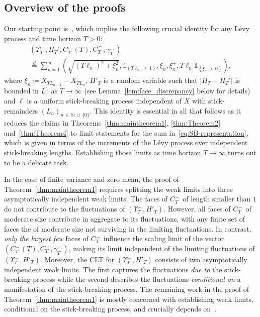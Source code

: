 \documentclass[AHL,Unicode,longabstracts,published]{cedram}
\newcommand\N{\mathbb{N}}
\newcommand\1{\mathds{1}}
\newcommand\eqd{\overset{d}{=}}
\newcommand\ov[1]{\overline{#1}}
\begin{document}
\subsection{Overview of the proofs}\label{sec:roadmap}

Our starting point is~\cite[Theorem~11]{CM_Fluctuation_Levy}, which implies the following crucial identity for any Lévy process and time horizon $T>0$:
\begin{equation}\label{eq:SB-representation}
\begin{multlined}
\left(\Upsilon_T^\frown, H_T', C_T^\frown(T),
\ov{C}_T^\frown,
\gamma_T^\frown\right)\\
\eqd \sum_{n=1}^\infty
\left(\sqrt{(T\ell_n)^2+\xi_n^2},
\1_{\left\{T\ell_n\,\ge\,1\right\}},
\xi_n,
\xi_n^+, T\ell_n\1_{\left\{\xi_n\,>\,0\right\}}\right),
\end{multlined}
\end{equation}
where $\xi_n\coloneqq X_{TL_{n-1}}-X_{TL_n}$, $H'_T$ is a random variable such that $|H_T-H_T'|$ is bounded in $L^1$ as $T\to\infty$ (see Lemma~\ref{lem:face_discrepancy} below for details) and $\ell$ is a uniform stick-breaking process independent of $X$ with stick-remainders $(L_n)_{n\,\in\,\N\,\cup\,\{0\}}$. This identity is essential in all that follows as it reduces the claims in Theorems~\ref{thm:maintheorem1}, \ref{thm:Theorem2} and~\ref{thm:Theorem4} to limit statements for the sum in~\eqref{eq:SB-representation}, which is given in terms of the increments of the Lévy process over independent stick-breaking lengths. Establishing those limits as time horizon $T\to\infty$ turns out to be a delicate task.

In the case of finite variance and zero mean, the proof of Theorem~\ref{thm:maintheorem1} requires splitting the weak limits into three asymptotically independent weak limits. The faces of $C_T^\frown$ of length smaller than $1$ do not contribute to the fluctuations of $(\Upsilon_T^\frown,H'_T)$. However, all faces of $C_T^\frown$ of moderate size contribute in aggregate to its fluctuations, with any finite set of faces the of moderate size not surviving in the limiting fluctuations. In contrast, \emph{only the largest few} faces of $C_T^\frown$ influence the scaling limit of the vector $(C_T^\frown(T),\ov C_T^\frown,\gamma_T^\frown)$, making its limit independent of the limiting fluctuations of $(\Upsilon_T^\frown,H'_T)$. Moreover, the CLT for $(\Upsilon_T^\frown,H'_T)$ consists of two asymptotically independent weak limits. The first captures the fluctuations \emph{due to} the stick-breaking process while the second describes the fluctuations \emph{conditional on} a manifestation of the stick-breaking process. The remaining work in the proof of Theorem~\ref{thm:maintheorem1} is mostly concerned with establishing weak limits, conditional on the stick-breaking process, and crucially depends on~\cite[Theorem~1.1]{MR4285923}.
\end{document}
